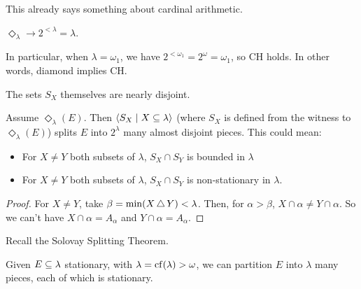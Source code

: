 This already says something about cardinal arithmetic.

\begin{boxcorollary}
    $\Diamond_{\lambda} \to 2^{<\lambda} = \lambda$.
\end{boxcorollary}

In particular, when $\lambda = \omega_1$, we have $2^{< \omega_1} = 2^{\omega} = \omega_1$, so CH holds. In other words, diamond implies CH.

The sets $S_X$ themselves are nearly disjoint.

\begin{boxlemma}
    Assume $\Diamond_{\lambda}(E)$. Then $\left\langle S_X \; \middle| \; X \subseteq \lambda \right\rangle$ (where $S_X$ is defined from the witness to $\Diamond_{\lambda}(E)$) splits $E$ into $2^{\lambda}$ many almost disjoint pieces. This could mean:
    \begin{itemize}
        \item For $X \neq Y$ both subsets of $\lambda$, $S_X \cap S_Y$ is bounded in $\lambda$
        \item For $X \neq Y$ both subsets of $\lambda$, $S_X \cap S_Y$ is non-stationary in $\lambda$.
    \end{itemize}
\end{boxlemma}
\begin{proof}
    For $X \neq Y$, take $\beta = \min(X \, \triangle \, Y) < \lambda$. Then, for $\alpha > \beta$, $X \cap \alpha \neq Y \cap \alpha$. So we can't have $X \cap \alpha = A_{\alpha}$ and $Y \cap \alpha  = A_{\alpha}$.
\end{proof}

Recall the Solovay Splitting Theorem.

\begin{boxtheorem}
    Given $E \subseteq \lambda$ stationary, with $\lambda = \operatorname{cf}(\lambda) > \omega$, we can partition $E$ into $\lambda$ many pieces, each of which is stationary.
\end{boxtheorem}
